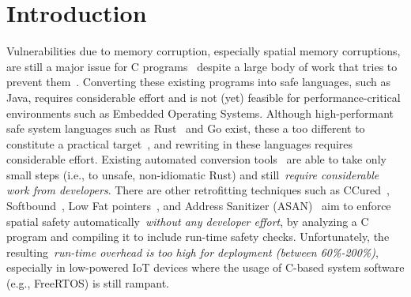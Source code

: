 \section{Introduction}
Vulnerabilities due to memory corruption, especially spatial memory corruptions, are still a major issue for C programs~\cite{cvetrend, microsoftmemsafe} despite a large body of work that tries
to prevent them~\cite{song2019sanitizing}.
Converting these existing programs into safe languages, such as Java, requires considerable effort and is not (yet) feasible for performance-critical environments such as Embedded Operating Systems.
Although high-performant safe system languages such as Rust~\cite{rustlang} and Go exist, these a too different to constitute a practical target~\cite{zeng2019identifying}, and rewriting in these languages requires considerable effort.
Existing automated conversion tools~\cite{c2rust,c2rusttalk, emre2021c2rust} are able to take only small steps (i.e., to unsafe, non-idiomatic Rust) and still~\emph{require considerable work from developers}.
There are other retrofitting techniques such as CCured~\cite{necula2005ccured},
Softbound~\cite{nagarakatte2009softbound}, Low Fat
pointers~\cite{duck2016heap}, and Address Sanitizer
(ASAN)~\cite{serebryany2012addresssanitizer} aim to enforce spatial safety
automatically~\emph{without any developer effort}, by analyzing a C program and compiling it to include
run-time safety checks. Unfortunately, the resulting~\emph{run-time overhead is too high
for deployment (between 60\%-200\%)}, especially in low-powered IoT devices where the usage of C-based system software (e.g., FreeRTOS) is still rampant.

